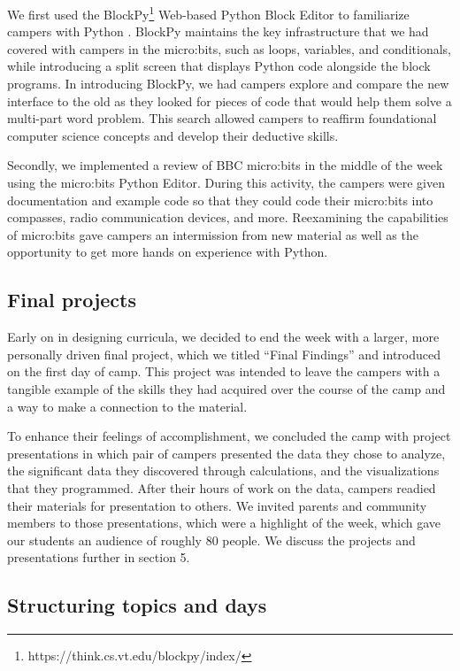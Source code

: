 We first used the BlockPy\footnote{https://think.cs.vt.edu/blockpy/index/}
Web-based Python Block Editor to familiarize campers with Python
\cite{Bart2017}.  BlockPy maintains the key infrastructure that we
had covered with campers in the micro:bits, such as loops, variables,
and conditionals, while introducing a split screen that displays
Python code alongside the block programs. In introducing BlockPy,
we had campers explore and compare the new interface to the old as
they looked for pieces of code that would help them solve a multi-part
word problem. This search allowed campers to reaffirm foundational
computer science concepts and develop their deductive skills.

Secondly, we implemented a review of BBC micro:bits in the middle
of the week using the micro:bits Python Editor. During this activity,
the campers were given documentation and example code so that they
could code their micro:bits into compasses, radio communication
devices, and more. Reexamining the capabilities of micro:bits gave
campers an intermission from new material as well as the opportunity
to get more hands on experience with Python.

\subsection{Final projects}

Early on in designing curricula, we decided to end the week with a
larger, more personally driven final project, which we titled ``Final
Findings'' and introduced on the first day of camp.  This project
was intended to leave the campers with a tangible example of the
skills they had acquired over the course of the camp and a way to
make a connection to the material.

To enhance their feelings of accomplishment, we concluded the camp
with project presentations in which pair of campers presented the
data they chose to analyze, the significant data they discovered
through calculations, and the visualizations that they programmed.
After their hours of work on the data, campers readied their materials
for presentation to others.  We invited parents and community members
to those presentations, which were a highlight of the week, which
gave our students an audience of roughly 80 people.  We discuss the
projects and presentations further in section 5.

\subsection{Structuring topics and days}

